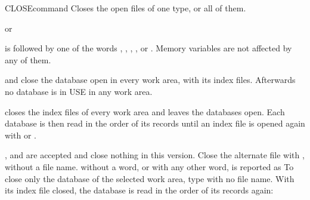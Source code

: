 \begin{XbaseEntry}{CLOSE}{command}
Closes the open files of one type, or all of them.
\Syntax
{}
\par or\par
{}
\Usage
{} is followed by one of the words , ,
, ,  or .  Memory variables
are not affected by any of them.

 and  close the database open in every
work area, with its index files.  Afterwards no database is in USE in any
work area.

 closes the index files of every work area and leaves the
databases open.  Each database is then read in the order of its records
until an index file is opened again with  or .

,  and  are
accepted and close nothing in this version.  Close the alternate file with
, without a file name.   without a word, or with any other word,
is reported as 
\Tips
To close only the database of the selected work area, type  with no
file name.
\Examples
{}
With its index file closed, the database is read in the order of its
records again:
\end{XbaseEntry}

